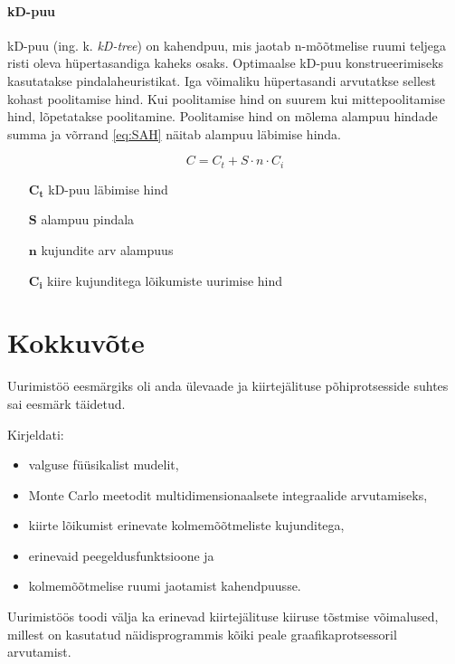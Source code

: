 \documentclass[a4paper,12pt]{report}
\begin{document}
\subsubsection{kD-puu}
kD-puu (ing. k. \textit{kD-tree}) on kahendpuu, mis jaotab n-mõõtmelise
ruumi teljega risti oleva hüpertasandiga kaheks osaks. Optimaalse kD-puu
konstrueerimiseks kasutatakse pindalaheuristikat. Iga võimaliku hüpertasandi
arvutatkse sellest kohast poolitamise hind. Kui poolitamise hind on suurem
kui mittepoolitamise hind, lõpetatakse poolitamine. Poolitamise hind on
mõlema alampuu hindade summa ja võrrand \ref{eq:SAH} näitab alampuu 
läbimise hinda.

\begin{equation} \label{eq:SAH}
C = C_t + S \cdot n \cdot C_i
\end{equation}
\begin{itemize}
\item[\(\mathbf{C_t}\)] kD-puu läbimise hind
\item[\(\mathbf{S}\)] alampuu pindala
\item[\(\mathbf{n}\)] kujundite arv alampuus
\item[\(\mathbf{C_i}\)] kiire kujunditega lõikumiste uurimise hind
\end{itemize}

\chapter*{Kokkuvõte}
Uurimistöö eesmärgiks oli anda ülevaade ja kiirtejälituse põhiprotsesside
suhtes sai eesmärk täidetud. 

Kirjeldati:
\begin{itemize}
\item valguse füüsikalist mudelit,
\item Monte Carlo meetodit multidimensionaalsete integraalide arvutamiseks,
\item kiirte lõikumist erinevate kolmemõõtmeliste kujunditega,
\item erinevaid peegeldusfunktsioone ja
\item kolmemõõtmelise ruumi jaotamist kahendpuusse.
\end{itemize}

Uurimistöös toodi välja ka erinevad kiirtejälituse kiiruse tõstmise
võimalused, millest on kasutatud näidisprogrammis kõiki peale
graafikaprotsessoril arvutamist.

\renewcommand\bibname{Kasutatud materjalid}


\end{document}
